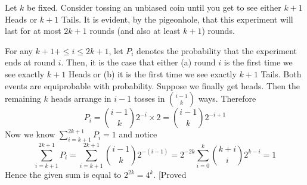 \documentclass[12pt]{article}
\newcommand\BackgroundPic{%
	\put(0,0){%
		\parbox[b][\paperheight]{\paperwidth}{%
			\vfill
			\centering
			\texttt{[image: 1.jpg]}%
			\vfill
}}}
\begin{document}
	\AddToShipoutPicture*{\BackgroundPic}
	
	
	
	Let $k$ be fixed. Consider tossing an unbiased coin until you get to see either $k+1$ Heads or $k+1$ Tails. It is evident, by the pigeonhole, that this experiment will last for at most $2k+1$ rounds (and also at least $k+1$) rounds.
	
	For any $k+1+\leq i\leq 2k+1$, let $P_i$ denotes the probability that the experiment ends at round $i$. Then, it is the case that either (a) round $i$ is the first time we see exactly $k+1$ Heads or (b) it is the first time we see exactly $k+1$ Tails. Both events are equiprobable with probability. Suppose we finally get heads. Then the remaining $k$ heads arrange in $i-1$ tosses in ${{i-1}\choose{k}}$ ways. Therefore $$P_i={{i-1}\choose{k}}2^{-i}\times 2={{i-1}\choose{k}}2^{-i+1}$$Now we know $\sum\limits_{i=k+1}^{2k+1}P_i=1$ and notice $$\sum\limits_{i=k+1}^{2k+1}P_i=\sum\limits_{i=k+1}^{2k+1}{{i-1}\choose{k}}2^{-(i-1)}=2^{-2k}\sum\limits_{i=0}^{k}{{k+i}\choose{i}}2^{k-i}=1$$Hence the given sum is equal to $2^{2k}=4^k$. [Proved
	\pagebreak 
	
\end{document}
